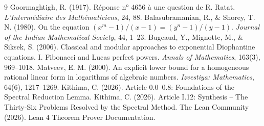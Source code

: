 \documentclass[11pt,a4paper]{article}
\begin{document}

\begin{thebibliography}{9}
  Goormaghtigh, R. (1917). Réponse n° 4656 à une question de R. Ratat. \emph{L'Intermédiaire des Mathématiciens}, 24, 88.
  Balasubramanian, R., \& Shorey, T. N. (1980). On the equation \((x^{m}-1)/(x-1) = (y^{n}-1)/(y-1)\). \emph{Journal of the Indian Mathematical Society}, 44, 1–23.
  Bugeaud, Y., Mignotte, M., \& Siksek, S. (2006). Classical and modular approaches to exponential Diophantine equations. I. Fibonacci and Lucas perfect powers. \emph{Annals of Mathematics}, 163(3), 969–1018.
  Matveev, E. M. (2000). An explicit lower bound for a homogeneous rational linear form in logarithms of algebraic numbers. \emph{Izvestiya: Mathematics}, 64(6), 1217–1269.
  Kithima, C. (2026). Article 0.0–0.8: Foundations of the Spectral Reduction Lemma.
  Kithima, C. (2026). Article I.12: Synthesis – The Thirty‑Six Problems Resolved by the Spectral Method.
  The Lean Community (2026). Lean 4 Theorem Prover Documentation.
\end{thebibliography}
\end{document}
